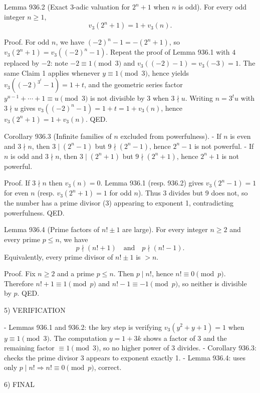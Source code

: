 Lemma 936.2 (Exact 3-adic valuation for \(2^{n}+1\) when \(n\) is odd).
For every odd integer \(n\ge 1\),
\[v_3(2^{n}+1)=1+v_3(n).\]

Proof.
For odd \(n\), we have \((-2)^n-1 = -(2^n+1)\), so \(v_3(2^n+1)=v_3((-2)^n-1)\).
Repeat the proof of Lemma 936.1 with \(4\) replaced by \(-2\): note \(-2\equiv 1\pmod 3\) and \(v_3((-2)-1)=v_3(-3)=1\). The same Claim 1 applies whenever \(y\equiv 1\pmod 3\), hence yields
\(v_3((-2)^{3^t}-1)=1+t\), and the geometric series factor \(y^{u-1}+\cdots+1\equiv u\pmod 3\) is not divisible by 3 when \(3\nmid u\). Writing \(n=3^t u\) with \(3\nmid u\) gives \(v_3((-2)^n-1)=1+t=1+v_3(n)\), hence \(v_3(2^n+1)=1+v_3(n)\). QED.

Corollary 936.3 (Infinite families of \(n\) excluded from powerfulness).
- If \(n\) is even and \(3\nmid n\), then \(3\mid (2^n-1)\) but \(9\nmid (2^n-1)\), hence \(2^n-1\) is not powerful.
- If \(n\) is odd and \(3\nmid n\), then \(3\mid (2^n+1)\) but \(9\nmid (2^n+1)\), hence \(2^n+1\) is not powerful.

Proof.
If \(3\nmid n\) then \(v_3(n)=0\). Lemma 936.1 (resp. 936.2) gives \(v_3(2^n-1)=1\) for even \(n\) (resp. \(v_3(2^n+1)=1\) for odd \(n\)). Thus 3 divides but 9 does not, so the number has a prime divisor (3) appearing to exponent 1, contradicting powerfulness. QED.

Lemma 936.4 (Prime factors of \(n!\pm 1\) are large).
For every integer \(n\ge 2\) and every prime \(p\le n\), we have
\[p\nmid (n!+1)\quad\text{and}\quad p\nmid (n!-1).\]
Equivalently, every prime divisor of \(n!\pm 1\) is \(>n\).

Proof.
Fix \(n\ge 2\) and a prime \(p\le n\). Then \(p\mid n!\), hence \(n!\equiv 0\pmod p\). Therefore \(n!+1\equiv 1\pmod p\) and \(n!-1\equiv -1\pmod p\), so neither is divisible by \(p\). QED.

5) VERIFICATION

- Lemmas 936.1 and 936.2: the key step is verifying \(v_3(y^2+y+1)=1\) when \(y\equiv 1\pmod 3\). The computation \(y=1+3k\) shows a factor of 3 and the remaining factor \(\equiv 1\pmod 3\), so no higher power of 3 divides.
- Corollary 936.3: checks the prime divisor 3 appears to exponent exactly 1.
- Lemma 936.4: uses only \(p\mid n!\Rightarrow n!\equiv 0\pmod p\), correct.

6) FINAL

